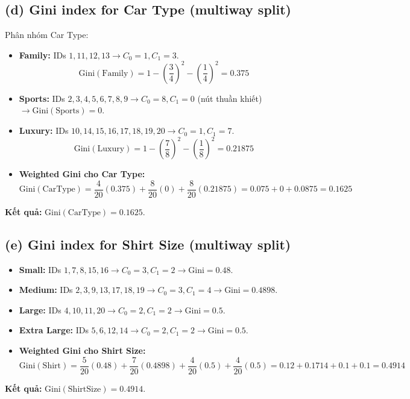 \subsection*{(d) Gini index for Car Type (multiway split)}
Phân nhóm Car Type:
\begin{itemize}
    \item \textbf{Family:} IDs $1, 11, 12, 13 \rightarrow C_0 = 1, C_1 = 3$.
    $$\text{Gini}(\text{Family}) = 1 - \left(\frac{3}{4}\right)^2 - \left(\frac{1}{4}\right)^2 = 0.375$$
    \item \textbf{Sports:} IDs $2, 3, 4, 5, 6, 7, 8, 9 \rightarrow C_0 = 8, C_1 = 0$ (nút thuần khiết) $\rightarrow \text{Gini}(\text{Sports}) = 0$.
    \item \textbf{Luxury:} IDs $10, 14, 15, 16, 17, 18, 19, 20 \rightarrow C_0 = 1, C_1 = 7$.
    $$\text{Gini}(\text{Luxury}) = 1 - \left(\frac{7}{8}\right)^2 - \left(\frac{1}{8}\right)^2 = 0.21875$$
    \item \textbf{Weighted Gini cho Car Type:}
    $$\text{Gini}(\text{CarType}) = \frac{4}{20}(0.375) + \frac{8}{20}(0) + \frac{8}{20}(0.21875) = 0.075 + 0 + 0.0875 = 0.1625$$
\end{itemize}
\textbf{Kết quả:} $\text{Gini}(\text{CarType}) = 0.1625$.

\subsection*{(e) Gini index for Shirt Size (multiway split)}
\begin{itemize}
    \item \textbf{Small:} IDs $1, 7, 8, 15, 16 \rightarrow C_0 = 3, C_1 = 2 \rightarrow \text{Gini} = 0.48$.
    \item \textbf{Medium:} IDs $2, 3, 9, 13, 17, 18, 19 \rightarrow C_0 = 3, C_1 = 4 \rightarrow \text{Gini} = 0.4898$.
    \item \textbf{Large:} IDs $4, 10, 11, 20 \rightarrow C_0 = 2, C_1 = 2 \rightarrow \text{Gini} = 0.5$.
    \item \textbf{Extra Large:} IDs $5, 6, 12, 14 \rightarrow C_0 = 2, C_1 = 2 \rightarrow \text{Gini} = 0.5$.
    \item \textbf{Weighted Gini cho Shirt Size:}
    $$\text{Gini}(\text{Shirt}) = \frac{5}{20}(0.48) + \frac{7}{20}(0.4898) + \frac{4}{20}(0.5) + \frac{4}{20}(0.5) = 0.12 + 0.1714 + 0.1 + 0.1 = 0.4914$$
\end{itemize}
\textbf{Kết quả:} $\text{Gini}(\text{ShirtSize}) = 0.4914$.

